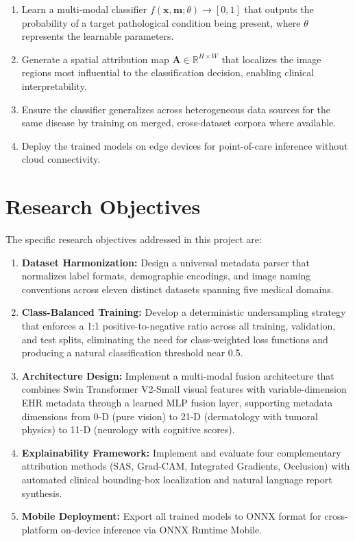 \documentclass[12pt,a4paper]{report}
\begin{document}
\begin{enumerate}
    \item Learn a multi-modal classifier $f(\mathbf{x}, \mathbf{m}; \theta) \rightarrow [0, 1]$ that outputs the probability of a target pathological condition being present, where $\theta$ represents the learnable parameters.
    
    \item Generate a spatial attribution map $\mathbf{A} \in \mathbb{R}^{H \times W}$ that localizes the image regions most influential to the classification decision, enabling clinical interpretability.
    
    \item Ensure the classifier generalizes across heterogeneous data sources for the same disease by training on merged, cross-dataset corpora where available.
    
    \item Deploy the trained models on edge devices for point-of-care inference without cloud connectivity.
\end{enumerate}

\section{Research Objectives}

The specific research objectives addressed in this project are:

\begin{enumerate}
    \item \textbf{Dataset Harmonization:} Design a universal metadata parser that normalizes label formats, demographic encodings, and image naming conventions across eleven distinct datasets spanning five medical domains.
    
    \item \textbf{Class-Balanced Training:} Develop a deterministic undersampling strategy that enforces a 1:1 positive-to-negative ratio across all training, validation, and test splits, eliminating the need for class-weighted loss functions and producing a natural classification threshold near 0.5.
    
    \item \textbf{Architecture Design:} Implement a multi-modal fusion architecture that combines Swin Transformer V2-Small visual features with variable-dimension EHR metadata through a learned MLP fusion layer, supporting metadata dimensions from 0-D (pure vision) to 21-D (dermatology with tumoral physics) to 11-D (neurology with cognitive scores).
    
    \item \textbf{Explainability Framework:} Implement and evaluate four complementary attribution methods (SAS, Grad-CAM, Integrated Gradients, Occlusion) with automated clinical bounding-box localization and natural language report synthesis.
    
    \item \textbf{Mobile Deployment:} Export all trained models to ONNX format for cross-platform on-device inference via ONNX Runtime Mobile.
\end{enumerate}
\end{document}
